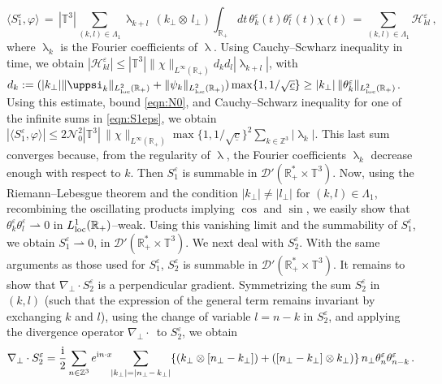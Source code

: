 \documentclass[11pt,reqno]{amsart}
\def \R{{\mathbb{R}}}
\def \Z{{\mathbb{Z}}}
\def \T{{\mathbb{T}}}
\begin{document}
  \begin{equation}
    \label{eqn:S1eps}
    \langle S_1^\varepsilon,\varphi \rangle 
    \, =\, |\T^3|\!\!\! \sum_{(k,l) \in \Lambda_1} \!\!\!\! \uplambda_{k+l}\, (k_\perp \otimes \,l_\perp) \!\! \int_{\R_+} \!\!\! \! dt \,  \theta_k^\varepsilon(t)  \theta_l^\varepsilon(t) \chi(t) 
    \, =\!\!\!\!\sum_{(k,l) \in \Lambda_1}\!\!\!\! \mathcal H_{kl}^\varepsilon
    \,, 
  \end{equation}
  where $\uplambda_{k}$ is the Fourier coefficients of $\uplambda$. Using Cauchy--Scwharz inequality in time, we obtain $| \mathcal H _{kl}^\varepsilon| \leq |\T^3|\|\chi\|_{L^\infty(\R_+)} d_k d_l |\uplambda_{k+l}|$, with $d_k:=(|k_\perp|\| \uppsi_k\|_{L_{\rm loc}^2(\R_+)} + \| \psi_k\|_{L_{\rm loc}^2(\R_+)} ) \max\{1,1/\sqrt{\underline{c}}\} \geq |k_\perp| \,\| \theta_k^\varepsilon\|_{L_{\rm loc}^2(\R_+)}$. Using this estimate, bound \eqref{eqn:N0}, and Cauchy--Schwarz inequality for one of the infinite sums in \eqref{eqn:S1eps}, we obtain $|\langle S_1^\varepsilon,\varphi \rangle| \leq 2 \mathcal N_0^2 |\T^3|  \,\|\chi\|_{L^\infty(\R_+)}   \max\{1,1/\sqrt{\underline{c}}\}^2 \sum_{k\in \Z^3}|\uplambda_{k}|$. This last sum converges because, from the regularity of $\uplambda$, the Fourier coefficients $\uplambda_k$ decrease enough with respect to $k$. Then $S_1^\varepsilon$ is summable in $\mathcal D'(\R_+^* \times \T^3)$. Now, using the Riemann--Lebesgue theorem and the condition $ |k_\perp| \neq |l_\perp| $ for $ (k,l) \in \Lambda_1 $, recombining the oscillating products implying $ \cos $ and $ \sin$, we easily show that $\theta_k^\varepsilon\theta_l^\varepsilon \rightharpoonup 0$ in $L_{\rm loc}^1(\R_+)$--weak. Using this vanishing limit and the summability of $S_1^\varepsilon$, we obtain  $S_1^\varepsilon \rightharpoonup 0$, in $\mathcal D'(\R_+^* \times \T^3)$. We next deal with $S_2^\varepsilon $. With the same arguments as those used for $S_1^\varepsilon $, $S_2^\varepsilon$ is summable in $\mathcal D'(\R_+^* \times \T^3)$. It remains to show that $\nabla_\perp \cdot S_2^\varepsilon$ is a perpendicular gradient. Symmetrizing the sum $S_2^\varepsilon$ in $(k,l)$ (such that the expression of the general term remains invariant by exchanging $k$ and $l$), using the change of variable $l=n-k$ in $S_2^\varepsilon$, and applying the divergence operator $\nabla_\perp \cdot\,$ to $S_2^\varepsilon$, we obtain
  \[
  \nabla_\perp \cdot S_2^\varepsilon = \frac{\rm i}{2}\sum_{n\in\Z^3} e^{{\rm i}n\cdot x} \!\! \sum_{|k_\perp|=|n_\perp - \,k_\perp|}
  \{(k_\perp \otimes [n_\perp-k_\perp])+( [n_\perp-k_\perp] \otimes k_\perp)\} \, n_\perp \theta_n^\varepsilon \theta_{n-k}^\varepsilon\,.
  \]
\end{document}
